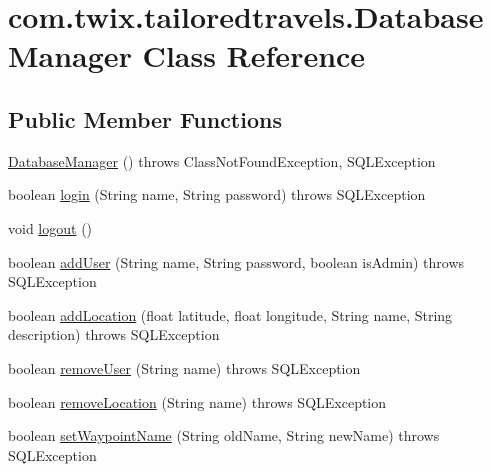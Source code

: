 \hypertarget{classcom_1_1twix_1_1tailoredtravels_1_1_database_manager}{\section{com.\-twix.\-tailoredtravels.\-Database\-Manager Class Reference}
\label{classcom_1_1twix_1_1tailoredtravels_1_1_database_manager}
}
\subsection*{Public Member Functions}
\begin{DoxyCompactItemize}
\item 
\hyperlink{classcom_1_1twix_1_1tailoredtravels_1_1_database_manager_a5fd81387462021f3a2c234596d7e669f}{Database\-Manager} ()  throws Class\-Not\-Found\-Exception, S\-Q\-L\-Exception 	
\item 
boolean \hyperlink{classcom_1_1twix_1_1tailoredtravels_1_1_database_manager_a7ad514c70febbb99b14d8a4dab1b24a6}{login} (String name, String password)  throws S\-Q\-L\-Exception 	
\item 
void \hyperlink{classcom_1_1twix_1_1tailoredtravels_1_1_database_manager_a3fe7ef841c1340941920745cc00a39ab}{logout} ()
\item 
boolean \hyperlink{classcom_1_1twix_1_1tailoredtravels_1_1_database_manager_ab60c1da42acf1d6ecc8955aa58da3803}{add\-User} (String name, String password, boolean is\-Admin)  throws S\-Q\-L\-Exception 	
\item 
boolean \hyperlink{classcom_1_1twix_1_1tailoredtravels_1_1_database_manager_a19c56c261a486a909936cf7c97334360}{add\-Location} (float latitude, float longitude, String name, String description)  throws S\-Q\-L\-Exception 	
\item 
boolean \hyperlink{classcom_1_1twix_1_1tailoredtravels_1_1_database_manager_a73d155c07d2ed41e8c596323184da135}{remove\-User} (String name)  throws S\-Q\-L\-Exception 	
\item 
boolean \hyperlink{classcom_1_1twix_1_1tailoredtravels_1_1_database_manager_ac60ff9d81a074ef84eb0f6ced1fa7fde}{remove\-Location} (String name)  throws S\-Q\-L\-Exception 	
\item 
boolean \hyperlink{classcom_1_1twix_1_1tailoredtravels_1_1_database_manager_a4c8078e19441474ebb02fd67dfe9d3b4}{set\-Waypoint\-Name} (String old\-Name, String new\-Name)  throws S\-Q\-L\-Exception 	
\item 

\end{DoxyCompactItemize}
